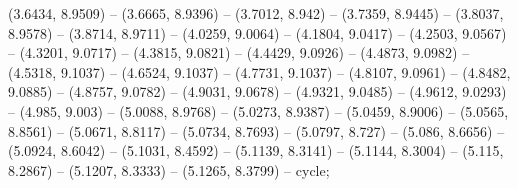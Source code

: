 (3.6434, 8.9509) -- (3.6665, 8.9396) -- (3.7012, 8.942) -- (3.7359, 8.9445) -- (3.8037, 8.9578) -- (3.8714, 8.9711) -- (4.0259, 9.0064) -- (4.1804, 9.0417) -- (4.2503, 9.0567) -- (4.3201, 9.0717) -- (4.3815, 9.0821) -- (4.4429, 9.0926) -- (4.4873, 9.0982) -- (4.5318, 9.1037) -- (4.6524, 9.1037) -- (4.7731, 9.1037) -- (4.8107, 9.0961) -- (4.8482, 9.0885) -- (4.8757, 9.0782) -- (4.9031, 9.0678) -- (4.9321, 9.0485) -- (4.9612, 9.0293) -- (4.985, 9.003) -- (5.0088, 8.9768) -- (5.0273, 8.9387) -- (5.0459, 8.9006) -- (5.0565, 8.8561) -- (5.0671, 8.8117) -- (5.0734, 8.7693) -- (5.0797, 8.727) -- (5.086, 8.6656) -- (5.0924, 8.6042) -- (5.1031, 8.4592) -- (5.1139, 8.3141) -- (5.1144, 8.3004) -- (5.115, 8.2867) -- (5.1207, 8.3333) -- (5.1265, 8.3799) -- cycle;



